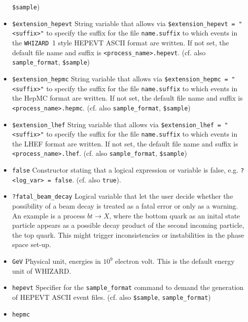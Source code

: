 \documentclass[12pt]{book}
\newcommand{\ttt}[1]{\texttt{#1}}
\newcommand{\whizard}{\texttt{WHIZARD}}
\begin{document}
\begin{itemize}
\ttt{\$sample})  
\item
\ttt{\$extension\_hepevt} \newline
String variable that allows via \ttt{\$extension\_hepevt = "<suffix>"} to 
specify the suffix for the file \ttt{name.suffix} to which events in
the \whizard\ 1 style HEPEVT ASCII format are written. If not set, the
default file name and suffix is
\ttt{<process\_name>.hepevt}. (cf. also \ttt{sample\_format},
\ttt{\$sample})   
\item
\ttt{\$extension\_hepmc} \newline
String variable that allows via \ttt{\$extension\_hepmc = "<suffix>"} to 
specify the suffix for the file \ttt{name.suffix} to which events in
the HepMC format are written. If not set, the default file name and suffix is
\ttt{<process\_name>.hepmc}. (cf. also \ttt{sample\_format},
\ttt{\$sample})  
\item
\ttt{\$extension\_lhef} \newline
String variable that allows via \ttt{\$extension\_lhef = "<suffix>"} to 
specify the suffix for the file \ttt{name.suffix} to which events in
the LHEF format are written. If not set, the default file name and suffix is
\ttt{<process\_name>.lhef}. (cf. also \ttt{sample\_format},
\ttt{\$sample})  
\item
\ttt{false} \newline
Constructor stating that a logical expression or variable is false,
e.g. \ttt{?<log\_var> = false}. (cf. also \ttt{true}).
\item
\ttt{?fatal\_beam\_decay} \newline
Logical variable that let the user decide whether the possibility of a
beam decay is treated as a fatal error or only as a warning. An
example is a process $b t \to X$, where the bottom quark as an inital
state particle appears as a possible decay product of the second
incoming particle, the top quark. This might trigger inconsistencies
or instabilities in the phase space set-up.
\item
\ttt{GeV} \newline 
Physical unit, energies in $10^9$ electron volt. This is the default
energy unit of WHIZARD.
\item
\ttt{hepevt} \newline 
Specifier for the \ttt{sample\_format} command to demand the
generation of HEPEVT ASCII event files. (cf. also \ttt{\$sample},
\ttt{sample\_format}) 
\item
\ttt{hepmc} \newline 

\end{itemize}
\end{document}
